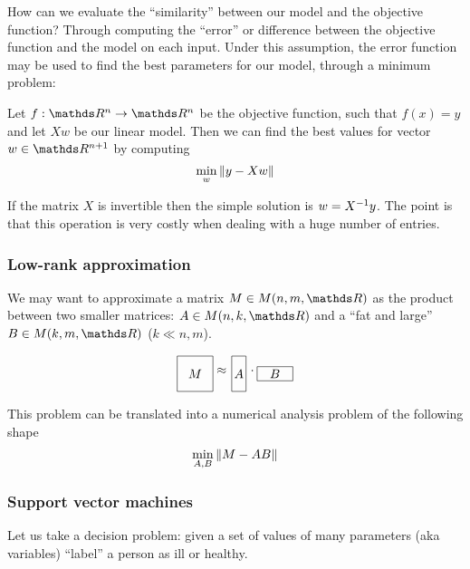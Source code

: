 \documentclass[computationalMathematics.tex]{subfiles}
\begin{document}
How can we evaluate the ``similarity'' between our model and the objective function? Through computing the ``error'' or difference between the objective function and the model on each input.
Under this assumption, the error function may be used to find the best parameters for our model, through a minimum problem:

\begin{definition}
  Let $f: \R^n \to \R^n$ be the objective function, such that $f(x) = y$ and let $Xw$ be our linear model. Then we can find the best values for vector $w \in \R^{n+1}$ by computing 
\[
  \min_{w} \left\lVert y - X w\right\rVert
\]
\end{definition}

If the matrix $X$ is invertible then the simple solution is $w = {X}^{-1}y$.
The point is that this operation is very costly when dealing with a huge number of entries.

\subsubsection{Low-rank approximation}
We may want to approximate a matrix $M \in M(n, m, \R)$ as the product between two smaller matrices: $A\in M(n, k, \R)$ and a ``fat and large'' $B\in M(k, m, \R)$ ($k\ll n, m$).

\[
  \begin{tikzpicture}[baseline=(current bounding box.center)]
    \draw (0,0) rectangle (1,1);
    \node at (0.5,0.5) {$M$};
  \end{tikzpicture}
  \approx
  \begin{tikzpicture}[baseline=(current bounding box.center)]
    \draw (0,0) rectangle (0.4,1);
    \node at (0.2,0.5) {$A$};
  \end{tikzpicture}
  \cdot
  \begin{tikzpicture}[baseline=(current bounding box.center)]
    \draw (0,0) rectangle (1,0.4);
    \node at (0.5,0.2) {$B$};
  \end{tikzpicture}
\]

This problem can be translated into a numerical analysis problem of the following shape
\[
  \min_{A, B} \left\lVert M - AB\right\rVert
\]


\subsubsection{Support vector machines}

Let us take a decision problem: given a set of values of many parameters (aka variables) ``label'' a person as ill or healthy.
\end{document}
